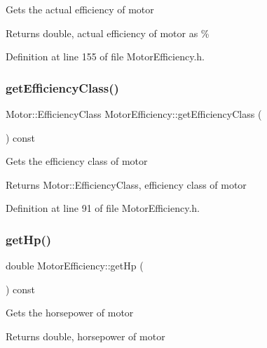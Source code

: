 Gets the actual efficiency of motor \begin{DoxyReturn}{Returns}
double, actual efficiency of motor as \% 
\end{DoxyReturn}


Definition at line 155 of file Motor\+Efficiency.\+h.

\mbox{\label{class_motor_efficiency_a9eb7d5c2fc598f655c1a3d12790e4d17}} 
\subsubsection{\texorpdfstring{get\+Efficiency\+Class()}{getEfficiencyClass()}}
{\footnotesize\ttfamily Motor\+::\+Efficiency\+Class Motor\+Efficiency\+::get\+Efficiency\+Class (\begin{DoxyParamCaption}{ }\end{DoxyParamCaption}) const\hspace{0.3cm}{\ttfamily [inline]}}

Gets the efficiency class of motor \begin{DoxyReturn}{Returns}
Motor\+::\+Efficiency\+Class, efficiency class of motor 
\end{DoxyReturn}


Definition at line 91 of file Motor\+Efficiency.\+h.

\mbox{\label{class_motor_efficiency_a9f88159c82daa270975d7969debe88a9}} 
\subsubsection{\texorpdfstring{get\+Hp()}{getHp()}}
{\footnotesize\ttfamily double Motor\+Efficiency\+::get\+Hp (\begin{DoxyParamCaption}{ }\end{DoxyParamCaption}) const\hspace{0.3cm}{\ttfamily [inline]}}

Gets the horsepower of motor \begin{DoxyReturn}{Returns}
double, horsepower of motor 
\end{DoxyReturn}


